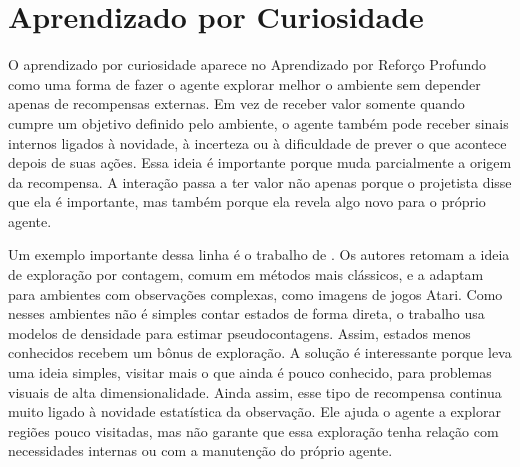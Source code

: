 \section{Aprendizado por Curiosidade}


O aprendizado por curiosidade aparece no Aprendizado por Reforço Profundo como uma forma de fazer o agente explorar melhor o ambiente sem depender apenas de recompensas externas. Em vez de receber valor somente quando cumpre um objetivo definido pelo ambiente, o agente também pode receber sinais internos ligados à novidade, à incerteza ou à dificuldade de prever o que acontece depois de suas ações. Essa ideia é importante porque muda parcialmente a origem da recompensa. A interação passa a ter valor não apenas porque o projetista disse que ela é importante, mas também porque ela revela algo novo para o próprio agente.

Um exemplo importante dessa linha é o trabalho de . Os autores retomam a ideia de exploração por contagem, comum em métodos mais clássicos, e a adaptam para ambientes com observações complexas, como imagens de jogos Atari. Como nesses ambientes não é simples contar estados de forma direta, o trabalho usa modelos de densidade para estimar pseudocontagens. Assim, estados menos conhecidos recebem um bônus de exploração. A solução é interessante porque leva uma ideia simples, visitar mais o que ainda é pouco conhecido, para problemas visuais de alta dimensionalidade. Ainda assim, esse tipo de recompensa continua muito ligado à novidade estatística da observação. Ele ajuda o agente a explorar regiões pouco visitadas, mas não garante que essa exploração tenha relação com necessidades internas ou com a manutenção do próprio agente.

